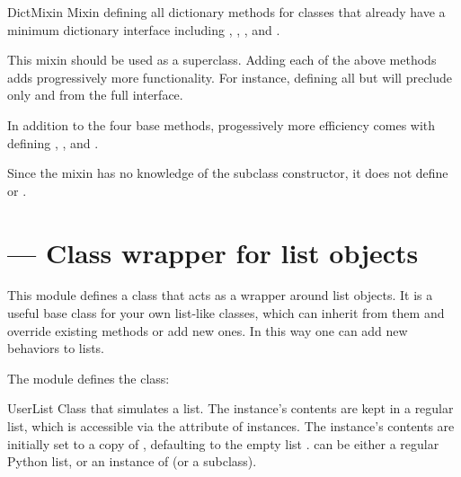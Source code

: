 \begin{classdesc}{DictMixin}{}
Mixin defining all dictionary methods for classes that already have
a minimum dictionary interface including ,
, , and .

This mixin should be used as a superclass.  Adding each of the
above methods adds progressively more functionality.  For instance,
defining all but  will preclude only 
and  from the full interface.

In addition to the four base methods, progessively more efficiency
comes with defining , , and
.

Since the mixin has no knowledge of the subclass constructor, it
does not define  or .
\end{classdesc}


\section{ ---
         Class wrapper for list objects}




This module defines a class that acts as a wrapper around
list objects.  It is a useful base class for
your own list-like classes, which can inherit from
them and override existing methods or add new ones.  In this way one
can add new behaviors to lists.

The  module defines the  class:

\begin{classdesc}{UserList}{}
Class that simulates a list.  The instance's
contents are kept in a regular list, which is accessible via the
 attribute of  instances.  The instance's
contents are initially set to a copy of , defaulting to the
empty list \code{[]}.   can be either a regular Python list,
or an instance of  (or a subclass).
\end{classdesc}

